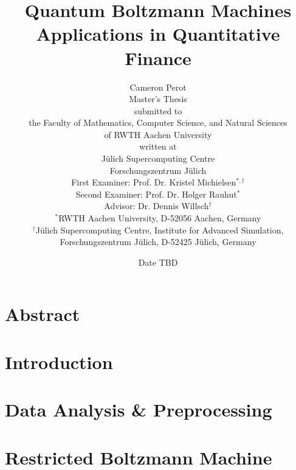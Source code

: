 \documentclass[11pt,twoside]{report}
\title{
    {Quantum Boltzmann Machines}\\
    {\large Applications in Quantitative Finance}
}
\author{
    {\LARGE Cameron Perot\vspace{1cm}}\\
    {Master's Thesis\vspace{0.1cm}}\\
    {\small submitted to\vspace{0.1cm}}\\
    {the Faculty of Mathematics, Computer Science, and Natural Sciences}\\
    {of RWTH Aachen University\vspace{0.1cm}}\\
    {\small written at\vspace{0.1cm}}\\
    {Jülich Supercomputing Centre}\\
    {Forschungszentrum Jülich\vspace{1cm}}\\
    {First Examiner: Prof. Dr. Kristel Michielsen\( ^{*,\dag} \)}\\
    {Second Examiner: Prof. Dr. Holger Rauhut\( ^* \)}\\
    {Advisor: Dr. Dennis Willsch\( ^\dag \)\vspace{0.1cm}}\\
    {\footnotesize\( ^* \)RWTH Aachen University, D-52056 Aachen, Germany}\\
    {\footnotesize\( ^\dag \)Jülich Supercomputing Centre, Institute for Advanced Simulation,}\\
    {\footnotesize Forschungszentrum Jülich, D-52425 Jülich, Germany\vspace{0.5cm}}
}
\date{Date TBD}
\begin{document}
\maketitle
{}

\clearpage\shipout\null
\chapter*{Abstract}
\clearpage\shipout\null

\tableofcontents
\clearpage\shipout\null

\chapter{Introduction}
\label{ch:introduction}


\chapter{Data Analysis \& Preprocessing}
\label{ch:data_analysis}


\chapter{Restricted Boltzmann Machine}
\label{ch:rbm}


\end{document}
